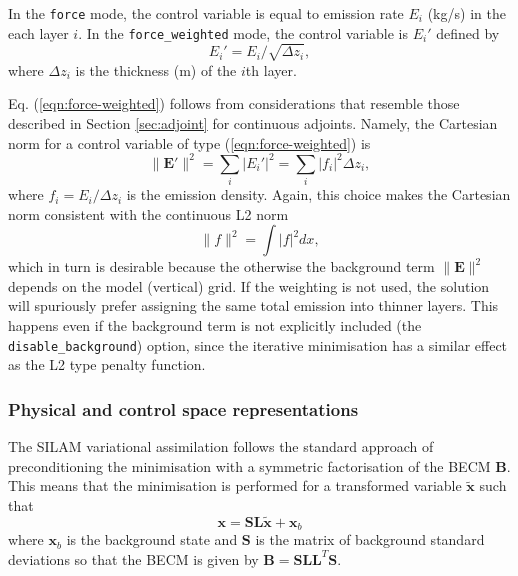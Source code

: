 \documentclass[a4paper]{article}
\begin{document}
In the \verb|force| mode, the control variable is equal to emission rate $E_i$ (kg/s) in
the each layer $i$. In the \verb|force_weighted| mode, the control variable is $E_i'$
defined by
\begin{equation}
\label{eqn:force-weighted}
E_i' = E_i / \sqrt{\Delta z_i},
\end{equation}
where $\Delta z_i$ is the thickness (m) of the $i$th layer. 

Eq. (\ref{eqn:force-weighted}) follows from considerations that resemble those described in
Section \ref{sec:adjoint} for continuous adjoints. Namely, the Cartesian norm for a
control variable of type (\ref{eqn:force-weighted}) is
\begin{equation}
\|\mathbf{E}'\|^2 = \sum_i |E_i'|^2 = \sum_i |f_i|^2\Delta z_i,
\end{equation}
where $f_i = E_i / \Delta z_i$ is the emission density. Again, this choice makes the
Cartesian norm consistent with the continuous L2 norm
\begin{equation}
\|f\|^2 = \int |f|^2 dx,
\end{equation}
which in turn is desirable because the otherwise the background term $\|\mathbf{E}\|^2$
depends on the model (vertical) grid. If the weighting is not used, the solution will
spuriously prefer assigning the same total emission into thinner layers. This happens even
if the background term is not explicitly included (the \verb|disable_background|) option,
since the iterative minimisation has a similar effect as the L2 type penalty function.

\subsubsection{Physical and control space representations}

The SILAM variational assimilation follows the standard approach of preconditioning the
minimisation with a symmetric factorisation of the BECM $\mathbf{B}$. This means that the
minimisation is performed for a transformed variable $\mathbf{\tilde{x}}$ such that
\begin{equation}
\label{eqn:cov-transf}
\mathbf{x} = \mathbf{SL\tilde{x}} + \mathbf{x}_b
\end{equation}
where $\mathbf{x}_b$ is the background state and $\mathbf{S}$ is the matrix of background
standard deviations so that the BECM is given by $\mathbf{B} = \mathbf{SLL}^T\mathbf{S}$.
\end{document}
